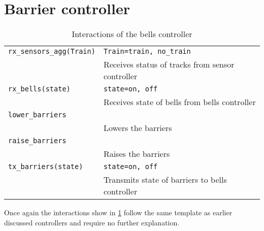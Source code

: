\documentclass[final]{report}
\begin{document}
\section{Barrier controller}
\begin{table}[H]
\centering
    \begin{tabular}{|l|l|}
    \hline
    \texttt{rx\_sensors\_agg(Train)} & \texttt{Train=train, no\_train}                  \\
                                     & Receives status of tracks from sensor controller \\
    \texttt{rx\_bells(state)}        & \texttt{state=on, off}                           \\
                                     & Receives state of bells from bells controller    \\ \hline
    \texttt{lower\_barriers}         &                                                  \\
                                     & Lowers the barriers                              \\
    \texttt{raise\_barriers}         &                                                  \\
                                     & Raises the barriers                              \\
    \texttt{tx\_barriers(state)}     & \texttt{state=on, off}                           \\
                                     & Transmits state of barriers to bells controller  \\ \hline
    \end{tabular}
\caption{Interactions of the bells controller}
\label{tab:barriersSignals}
\end{table}

Once again the interactions show in \cref{tab:barriersSignals} follow the same template as earlier discussed controllers and require no further explanation.
\end{document}
